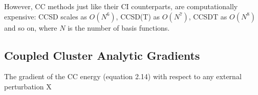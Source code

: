 However, CC methods just like their CI counterparts, are computationally expensive: 
CCSD scales as $O(N^6)$, CCSD(T) as $O(N^7)$, CCSDT as $O(N^8)$ and so on, where $N$ 
is the number of basis functions.\\
\subsection{Coupled Cluster Analytic Gradients}
The gradient of the CC energy (equation 2.14) with respect to any external perturbation X 
